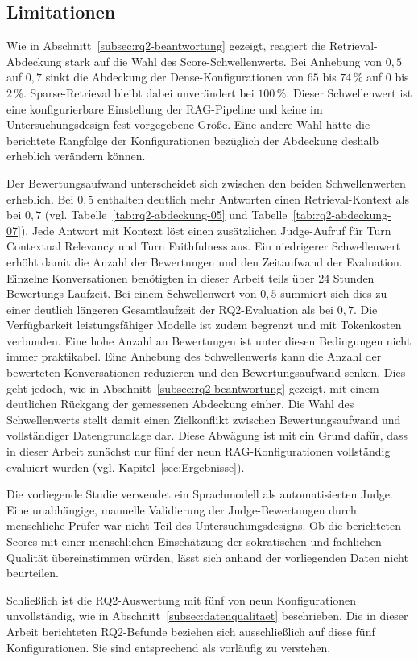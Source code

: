 \subsection{Limitationen}
\label{subsec:limitationen}

Wie in Abschnitt~\ref{subsec:rq2-beantwortung} gezeigt, reagiert die Retrieval-Abdeckung stark auf
die Wahl des Score-Schwellenwerts. Bei Anhebung von $0{,}5$ auf $0{,}7$ sinkt die Abdeckung der
Dense-Konfigurationen von $65$ bis $74\,\%$ auf $0$ bis $2\,\%$. Sparse-Retrieval bleibt dabei
unverändert bei $100\,\%$. Dieser Schwellenwert ist eine konfigurierbare Einstellung der
RAG-Pipeline und keine im Untersuchungsdesign fest vorgegebene Größe. Eine andere Wahl hätte die
berichtete Rangfolge der Konfigurationen bezüglich der Abdeckung deshalb erheblich verändern
können.

Der Bewertungsaufwand unterscheidet sich zwischen den beiden Schwellenwerten erheblich. Bei
$0{,}5$ enthalten deutlich mehr Antworten einen Retrieval-Kontext als bei $0{,}7$ (vgl.
Tabelle~\ref{tab:rq2-abdeckung-05} und Tabelle~\ref{tab:rq2-abdeckung-07}). Jede Antwort mit
Kontext löst einen zusätzlichen Judge-Aufruf für Turn Contextual Relevancy und Turn Faithfulness
aus. Ein niedrigerer Schwellenwert erhöht damit die Anzahl der Bewertungen und den Zeitaufwand der
Evaluation. Einzelne Konversationen benötigten in dieser Arbeit teils über 24 Stunden Bewertungs-Laufzeit. Bei
einem Schwellenwert von $0{,}5$ summiert sich dies zu einer deutlich längeren Gesamtlaufzeit der
RQ2-Evaluation als bei $0{,}7$. Die Verfügbarkeit leistungsfähiger Modelle ist zudem begrenzt und
mit Tokenkosten verbunden. Eine hohe Anzahl an Bewertungen ist unter diesen Bedingungen nicht immer
praktikabel. Eine Anhebung des Schwellenwerts kann die Anzahl der bewerteten Konversationen
reduzieren und den Bewertungsaufwand senken. Dies geht jedoch, wie in
Abschnitt~\ref{subsec:rq2-beantwortung} gezeigt, mit einem deutlichen Rückgang der gemessenen
Abdeckung einher. Die Wahl des Schwellenwerts stellt damit einen Zielkonflikt zwischen
Bewertungsaufwand und vollständiger Datengrundlage dar. Diese Abwägung ist mit ein Grund dafür,
dass in dieser Arbeit zunächst nur fünf der neun RAG-Konfigurationen vollständig evaluiert wurden
(vgl. Kapitel~\ref{sec:Ergebnisse}).

Die vorliegende Studie verwendet ein Sprachmodell als automatisierten Judge. Eine unabhängige,
manuelle Validierung der Judge-Bewertungen durch menschliche Prüfer war nicht Teil des
Untersuchungsdesigns. Ob die berichteten Scores mit einer menschlichen Einschätzung der
sokratischen und fachlichen Qualität übereinstimmen würden, lässt sich anhand der vorliegenden
Daten nicht beurteilen.

Schließlich ist die RQ2-Auswertung mit fünf von neun Konfigurationen unvollständig, wie in
Abschnitt~\ref{subsec:datenqualitaet} beschrieben. Die in dieser Arbeit berichteten RQ2-Befunde
beziehen sich ausschließlich auf diese fünf Konfigurationen. Sie sind entsprechend als vorläufig zu
verstehen.
